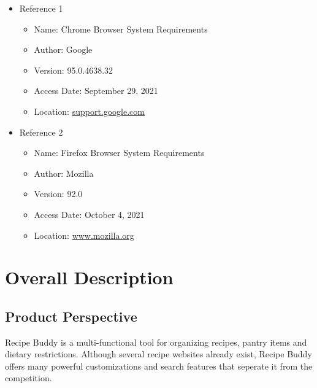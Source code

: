 \documentclass{scrreprt}
\begin{document}
\begin{itemize}
    \item Reference 1
          \begin{itemize}
              \item Name: Chrome Browser System Requirements
              \item Author: Google
              \item Version: 95.0.4638.32
              \item Access Date: September 29, 2021
              \item Location: \href{https://support.google.com/chrome/a/answer/7100626?hl=en}{support.google.com}
          \end{itemize}
    \item Reference 2
          \begin{itemize}
              \item Name: Firefox Browser System Requirements
              \item Author: Mozilla
              \item Version: 92.0
              \item Access Date: October 4, 2021
              \item Location: \href{https://www.mozilla.org/en-US/firefox/92.0.1/system-requirements/}{www.mozilla.org}
          \end{itemize}
\end{itemize}

\chapter{Overall Description}

\section{Product Perspective}
Recipe Buddy is a multi-functional tool for organizing recipes, pantry items and dietary restrictions.
Although several recipe websites already exist, Recipe Buddy offers many powerful customizations and search features that seperate it from the competition.
\end{document}
